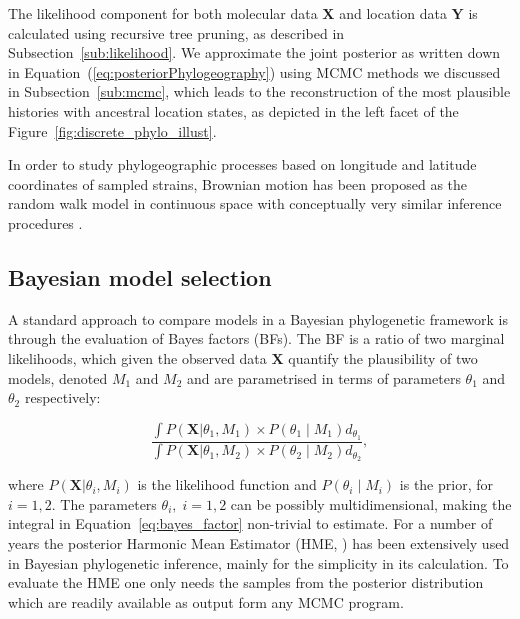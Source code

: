 The likelihood component for both molecular data $\mathbf{X}$ and location data $\mathbf{Y}$ is calculated using recursive tree pruning, as described in Subsection~\ref{sub:likelihood}.
We approximate the joint posterior as written down in Equation~(\ref{eq:posteriorPhylogeography}) using MCMC methods we discussed in Subsection~\ref{sub:mcmc}, which leads to the reconstruction of the most plausible histories with ancestral location states, as depicted in the left facet of the Figure~\ref{fig:discrete_phylo_illust}.

In order to study phylogeographic processes based on longitude and latitude coordinates of sampled strains, Brownian motion has been proposed as the random walk model in continuous space with conceptually very similar inference procedures \citep{Lemey2010}.


\subsection{Bayesian model selection\label{sub:model_selection}}

A standard approach to compare models in a Bayesian phylogenetic framework is through the evaluation of Bayes factors (BFs).   
The BF is a ratio of two marginal likelihoods, which given the observed data $\mathbf{X}$ quantify the plausibility of two models, denoted $M_{1}$ and $M_{2}$ and are parametrised in terms of parameters $\theta_{1}$ and $\theta_{2}$ respectively:

% 
\begin{equation}  
\frac{\int P\left(\mathbf{X}|\theta_{1},M_{1}\right)\times P\left(\theta_{1} \mid M_{1}  \right)d_{\theta_{1}}}{\int P\left(\mathbf{X}|\theta_{1},M_{2}\right)\times P\left(\theta_{2} \mid M_{2} \right)d_{\theta_{2}}},
\label{eq:bayes_factor}
\end{equation}  
% 

\noindent
where $P\left(\mathbf{X}|\theta_{i},M_{i}\right)$ is the likelihood function and $P\left(\theta_{i} \mid M_{i} \right)$ is the prior, for $i=1, 2$.
The parameters $\theta_{i},\; i=1, 2$ can be possibly multidimensional, making the integral in Equation~\ref{eq:bayes_factor} non-trivial to estimate.
For a number of years the posterior Harmonic Mean Estimator (HME, \cite{Newton1994}) has been extensively used in Bayesian phylogenetic inference, mainly for the simplicity in its calculation. 
To evaluate the HME one only needs the samples from the posterior distribution which are readily available as output form any MCMC program.


